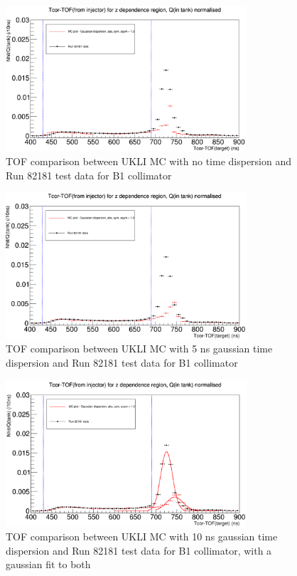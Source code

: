 \begin{figure}
    \centering
    \includegraphics[width=0.8\textwidth]{Figures/0ns_gaussian_dispersion_comparison.PNG}
    \caption{TOF comparison between UKLI MC with no time dispersion and Run 82181 test data for B1 collimator}
    \label{fig:0ns_time_dispersion}
\end{figure}

\begin{figure}
    \centering
    \includegraphics[width=0.8\textwidth]{Figures/5ns_gaussian_dispersion_comparison.PNG}
    \caption{TOF comparison between UKLI MC with 5 ns gaussian time dispersion and Run 82181 test data for B1 collimator}
    \label{fig:5ns_time_dispersion}
\end{figure}

\begin{figure}
    \centering
    \includegraphics[width=0.8\textwidth]{Figures/10ns_gaussian_dispersion_with_fit.PNG}
    \caption{TOF comparison between UKLI MC with 10 ns gaussian time dispersion and Run 82181 test data for B1 collimator, with a gaussian fit to both}
    \label{fig:10ns_time_dispersion}
\end{figure}

